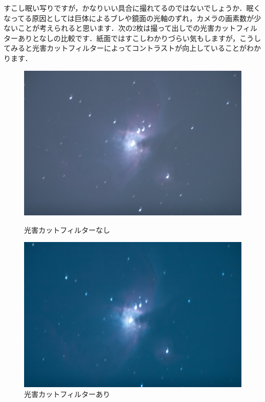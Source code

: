 \documentclass[../../super_nova_2023]{subfiles}
\begin{document}
すこし眠い写りですが，かなりいい具合に撮れてるのではないでしょうか．眠くなってる原因としては巨体によるブレや鏡面の光軸のずれ，カメラの画素数が少ないことが考えられると思います．次の2枚は撮って出しでの光害カットフィルターありとなしの比較です．紙面ではすこしわかりづらい気もしますが，こうしてみると光害カットフィルターによってコントラストが向上していることがわかります．
\begin{figure}[H]
	\centering
	\begin{minipage}{0.3\columnwidth}
		\centering
		\includegraphics[width=\columnwidth, angle=180]{figures/Yosuke/orion_ngt18_non.jpg}
		\caption{光害カットフィルターなし}
		\label{fig:orion_ngt18_no}
	\end{minipage}
	\begin{minipage}{0.3\columnwidth}
		\centering
		\includegraphics[width=\columnwidth, angle=180]{figures/Yosuke/orion_ngt18_cut.jpg}
		\caption{光害カットフィルターあり}
		\label{fig:orion_ngt18_cut}
	\end{minipage}
\end{figure}
\end{document}
